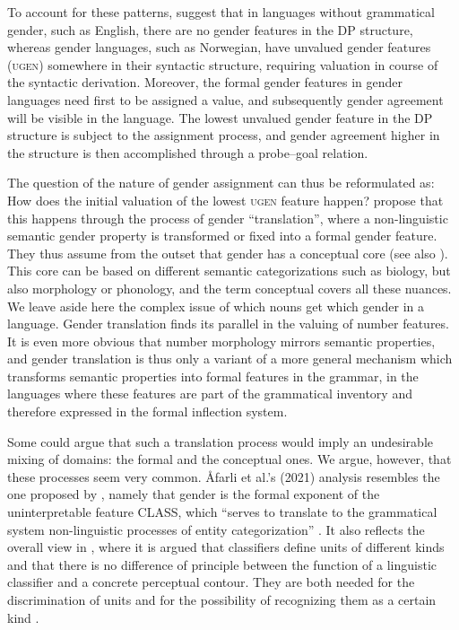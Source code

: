 \documentclass[output=paper]{langscibook}
\begin{document}
To account for these patterns, \citet{ÅfarliEtAl2021} suggest that in languages without grammatical gender, such as English, there are no gender features in the DP structure, whereas gender languages, such as Norwegian, have unvalued gender features (\textsc{ugen}) somewhere in their syntactic structure, requiring valuation in course of the syntactic derivation. Moreover, the formal gender features in gender languages need first to be assigned a value, and subsequently gender agreement will be visible in the language. The lowest unvalued gender feature in the DP structure is subject to the assignment process, and gender agreement higher in the structure is then accomplished through a probe–goal relation. 



The question of the nature of gender assignment can thus be reformulated as: How does the initial valuation of the lowest \textsc{ugen} feature happen? \citet{ÅfarliEtAl2021} propose that this happens through the process of gender ``translation'', where a non-linguistic semantic gender property is transformed or fixed into a formal gender feature. They thus assume from the outset that gender has a conceptual core (see also \citealt{Kramer2015, Corbett2013}). This core can be based on different semantic categorizations such as biology, but also morphology or phonology, and the term conceptual covers all these nuances. We leave aside here the complex issue of which nouns get which gender in a language. Gender translation finds its parallel in the valuing of number features. It is even more obvious that number morphology mirrors semantic properties, and gender translation is thus only a variant of a more general mechanism which transforms semantic properties into formal features in the grammar, in the languages where these features are part of the grammatical inventory and therefore expressed in the formal inflection system. 



Some could argue that such a translation process would imply an undesirable mixing of domains: the formal and the conceptual ones. We argue, however, that these processes seem very common. Åfarli et al.’s (2021) analysis resembles the one proposed by \citet{Picallo2008}, namely that gender is the formal exponent of the uninterpretable feature CLASS, which “serves to translate to the grammatical system non-linguistic processes of entity categorization” \citep[50]{Picallo2008}. It also reflects the overall view in \citet{Broschart2000}, where it is argued that classifiers define units of different kinds and that there is no difference of principle between the function of a linguistic classifier and a concrete perceptual contour. They are both needed for the discrimination of units and for the possibility of recognizing them as a certain kind \citep[264]{Broschart2000}.   
\end{document}
